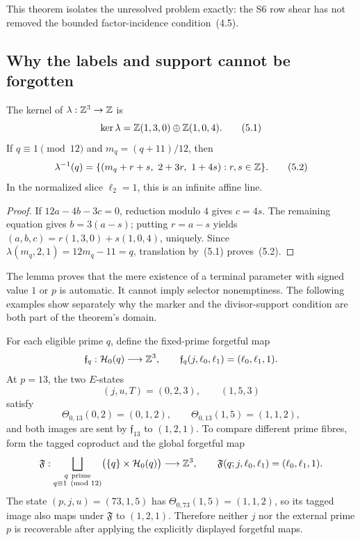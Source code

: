 This theorem isolates the unresolved problem exactly: the S6 row shear has
not removed the bounded factor-incidence condition~(4.5).

\subsection{Why the labels and support cannot be forgotten}

\begin{lemma}
The kernel of \(\lambda:\mathbb Z^3\to\mathbb Z\) is
\begin{equation}
 \ker\lambda=\mathbb Z(1,3,0)\oplus\mathbb Z(1,0,4).                    \tag{5.1}
\end{equation}
If \(q\equiv1\pmod {12}\) and \(m_q=(q+11)/12\), then
\begin{equation}
 \lambda^{-1}(q)=
 \{(m_q+r+s,\ 2+3r,\ 1+4s):r,s\in\ZZ\}.                   \tag{5.2}
\end{equation}
In the normalized slice \(\ell_2=1\), this is an infinite affine line.
\end{lemma}

\begin{proof}
If \(12a-4b-3c=0\), reduction modulo \(4\) gives \(c=4s\).  The remaining
equation gives \(b=3(a-s)\); putting \(r=a-s\) yields
\((a,b,c)=r(1,3,0)+s(1,0,4)\), uniquely.  Since
\(\lambda(m_q,2,1)=12m_q-11=q\), translation by~(5.1) proves~(5.2).
\end{proof}

The lemma proves that the mere existence of a terminal parameter with signed
value \(1\) or \(p\) is automatic.  It cannot imply selector nonemptiness.
The following examples show separately why the marker and the divisor-support
condition are both part of the theorem's domain.

\begin{example}\label{ex:esksb-tags}
For each eligible prime \(q\), define the fixed-prime forgetful map
\[
 \mathfrak f_q:\mathcal H_0(q)\longrightarrow\mathbb Z^3,
 \qquad
 \mathfrak f_q(j,\ell_0,\ell_1)=(\ell_0,\ell_1,1).
\]
At \(p=13\), the two \(E\)-states
\[
 (j,u,T)=(0,2,3),\qquad(1,5,3)
\]
satisfy
\[
 \Theta_{0,13}(0,2)=(0,1,2),
 \qquad
 \Theta_{0,13}(1,5)=(1,1,2),
\]
and both images are sent by \(\mathfrak f_{13}\) to
\((1,2,1)\).  To compare different prime fibres, form the tagged coproduct
and the global forgetful map
\[
 \mathfrak F:
 \bigsqcup_{\substack{q\ \text{prime}\\q\equiv1\pmod {12}}}
 \bigl(\{q\}\times\mathcal H_0(q)\bigr)
 \longrightarrow\mathbb Z^3,
 \qquad
 \mathfrak F(q;j,\ell_0,\ell_1)=(\ell_0,\ell_1,1).
\]
The state \((p,j,u)=(73,1,5)\) has
\(\Theta_{0,73}(1,5)=(1,1,2)\), so its tagged image also maps under
\(\mathfrak F\) to \((1,2,1)\).  Therefore neither \(j\) nor the external
prime \(p\) is recoverable after applying the explicitly displayed
forgetful maps.
\end{example}

